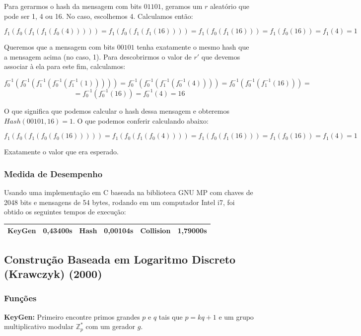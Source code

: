 \documentclass[a4paper]{article}
\begin{document}
Para gerarmos o hash da mensagem com bits $01101$, geramos um $r$
aleatório que pode ser 1, 4 ou 16. No caso, escolhemos 4. Calculamos
então:

$$
f_1(f_0(f_1(f_1(f_0(4))))) = f_1(f_0(f_1(f_1(16)))) = f_1(f_0(f_1(16))) =
f_1(f_0(16)) = f_1(4) = 1
$$

Queremos que a mensagem com bits $00101$ tenha exatamente o mesmo hash
que a mensagem acima (no caso, 1). Para descobrirmos o valor de $r'$
que devemos associar à ela para este fim, calculamos:

$$
f_0^{-1}(f_0^{-1}(f_1^{-1}(f_0^{-1}(f_1^{-1}(1))))) =
f_0^{-1}(f_0^{-1}(f_1^{-1}(f_0^{-1}(4)))) =
f_0^{-1}(f_0^{-1}(f_1^{-1}(16))) =
$$
$$
=f_0^{-1}(f_0^{-1}(16)) = f_0^{-1}(4) = 16
$$

O que significa que podemos calcular o hash dessa mensagem e obteremos
$Hash(00101, 16)=1$. O que podemos conferir calculando abaixo:

$$
f_1(f_0(f_1(f_0(f_0(16))))) = f_1(f_0(f_1(f_0(4)))) = f_1(f_0(f_1(16))) =
f_1(f_0(16)) = f_1(4) = 1
$$

Exatamente o valor que era esperado.

\subsubsection{Medida de Desempenho}

Usando uma implementação em C baseada na biblioteca GNU MP com chaves
de 2048 bits e mensagens de 54 bytes, rodando em um computador Intel
i7, foi obtido os seguintes tempos de execução:

\begin{center}
\begin{tabular}{|c|c|c|c|c|c|}
  \hline
  KeyGen & 0,43400s & Hash & 0,00104s & Collision & 1,79000s\\
  \hline
\end{tabular}
\end{center}


\subsection{Construção Baseada em Logaritmo Discreto (Krawczyk) (2000)
  \cite{krawczyk}}

\subsubsection{Funções}

\textbf{KeyGen: }Primeiro encontre primos grandes $p$ e $q$ tais que
$p = kq+1$ e um grupo multiplicativo modular $\mathbb{Z}^{*}_p$ com um
gerador $g$.
\end{document}
